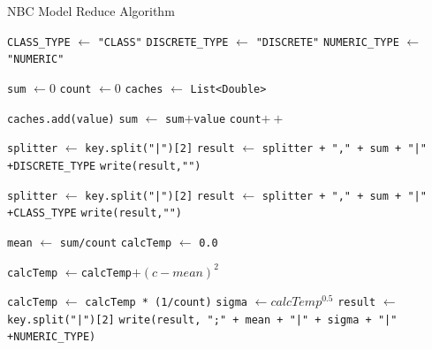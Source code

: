 \begin{enumerate}
	
\begin{algorithm}[H]
\caption{NBC Model Reduce Algorithm}\label{alg:NBCGenReduce}
\begin{algorithmic}[1]

\State \verb|CLASS_TYPE| $\gets$ \texttt{"CLASS"}
\State \verb|DISCRETE_TYPE| $\gets$ \texttt{"DISCRETE"}
\State \verb|NUMERIC_TYPE| $\gets$ \texttt{"NUMERIC"}

\State \texttt{sum} $\gets 0$
\State \texttt{count} $\gets 0$
\State \texttt{caches} $\gets$ \texttt{List<Double>}

	\State \texttt{caches.add(value)}
	\State \texttt{sum} $\gets$ \texttt{sum}$+$\texttt{value}
	\State \texttt{count}$++$
\EndFor


\State \texttt{splitter} $\gets$ \texttt{key.split("|")[2]}
\State \texttt{result} $\gets$ \texttt{splitter + "," + sum + "|" +}\verb|DISCRETE_TYPE|
\State \texttt{write(result,"")}


\State \texttt{splitter} $\gets$ \texttt{key.split("|")[2]}
\State \texttt{result} $\gets$ \texttt{splitter + "," + sum + "|" +}\verb|CLASS_TYPE|
\State \texttt{write(result,"")}


\State \texttt{mean} $\gets$ \texttt{sum/count}
\State \texttt{calcTemp} $\gets$ \texttt{0.0}

	\State \texttt{calcTemp} $\gets$\texttt{calcTemp}$+(c - mean)^2$
\EndFor

\State \texttt{calcTemp} $\gets$ \texttt{calcTemp * (1/count)}
\State \texttt{sigma} $\gets calcTemp^{0.5}$
\State \texttt{result} $\gets$  \texttt{key.split("|")[2]}
\State \texttt{write(result, ";" + mean + "|" + sigma + "|" +}\verb|NUMERIC_TYPE|\texttt{)}

\EndIf

\EndProcedure
\end{algorithmic}
\end{algorithm}


\end{enumerate}
